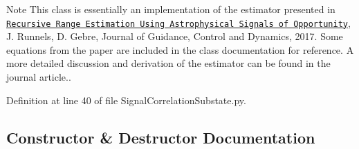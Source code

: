 \begin{DoxyNote}{Note}
This class is essentially an implementation of the estimator presented in \href{https://doi.org/10.2514/1.G002650}{\tt Recursive Range Estimation Using Astrophysical Signals of Opportunity}, J. Runnels, D. Gebre, Journal of Guidance, Control and Dynamics, 2017. Some equations from the paper are included in the class documentation for reference. A more detailed discussion and derivation of the estimator can be found in the journal article.. 
\end{DoxyNote}


Definition at line 40 of file Signal\+Correlation\+Substate.\+py.



\subsection{Constructor \& Destructor Documentation}
